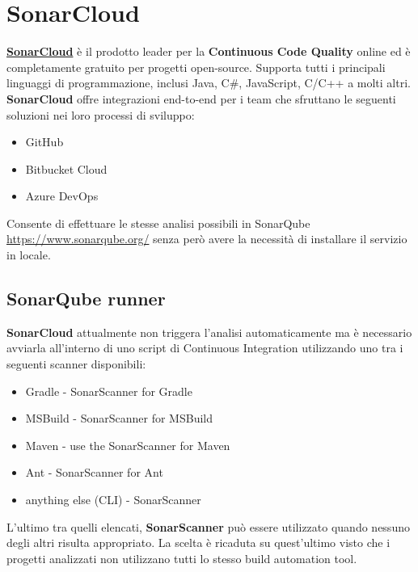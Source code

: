 \section{SonarCloud}
 \href{https://sonarcloud.io}{\textbf{SonarCloud}} è il prodotto leader per la \textbf{Continuous Code Quality} online ed è completamente gratuito per progetti open-source. Supporta tutti i principali linguaggi di programmazione, inclusi Java, C\#, JavaScript, C/C++ a molti altri. \textbf{SonarCloud} offre integrazioni end-to-end per i team che sfruttano le seguenti soluzioni nei loro processi di sviluppo:
\begin{itemize}
	\item GitHub
	\item Bitbucket Cloud
	\item Azure DevOps
\end{itemize}
Consente di effettuare le stesse analisi possibili in SonarQube \url{https://www.sonarqube.org/} senza però avere la necessità di installare il servizio in locale.
\subsection{SonarQube runner}
\textbf{SonarCloud} attualmente non triggera l'analisi automaticamente ma è necessario avviarla all'interno di uno script di Continuous Integration utilizzando uno tra i seguenti scanner disponibili:
\begin{itemize}
	\item Gradle - SonarScanner for Gradle
	\item MSBuild - SonarScanner for MSBuild
	\item Maven - use the SonarScanner for Maven
	\item Ant - SonarScanner for Ant
	\item anything else (CLI) - SonarScanner	
\end{itemize}
L'ultimo tra quelli elencati, \textbf{SonarScanner} può essere utilizzato quando nessuno degli altri risulta appropriato. La scelta è ricaduta su quest'ultimo visto che i progetti analizzati non utilizzano tutti lo stesso build automation tool. 
